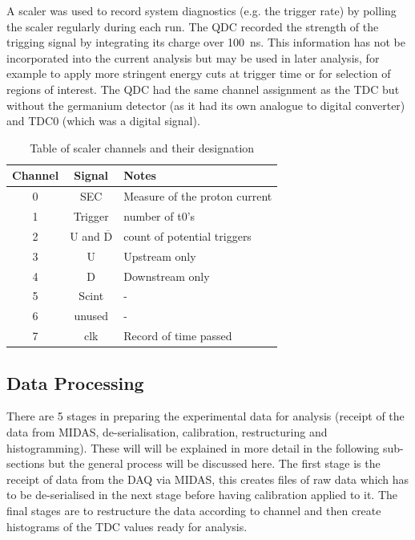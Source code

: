A scaler was used to record system diagnostics (e.g. the trigger rate) by polling the scaler regularly during each run. The QDC recorded the strength of the trigging signal by integrating its charge over 100~ns. This information has not be incorporated into the current analysis but may be used in later analysis, for example to apply more stringent energy cuts at trigger time or for selection of regions of interest. The QDC had the same channel assignment as the TDC but without the germanium detector (as it had its own analogue to digital converter) and TDC0 (which was a digital signal).
\begin{table}
    \centering
    \begin{tabular}{c|c|l}
        Channel & Signal & Notes\\
        \hline
        0 & SEC & Measure of the proton current\\
        1 & Trigger & number of t0's\\
        2 & U and $\overline{\text{D}}$ & count of potential triggers\\
        3 & U & Upstream only\\
        4 & D & Downstream only\\
        5 & Scint & -\\
        6 & unused & -\\
        7 & clk & Record of time passed\\
    \end{tabular}
    \caption{Table of scaler channels and their designation}
    \label{tab:scaler_chs}
\end{table}

\subsection{Data Processing} %
\label{sec:run_data}
There are 5 stages in preparing the experimental data for analysis (receipt of the data from MIDAS, de-serialisation, calibration, restructuring and histogramming). These will will be explained in more detail in the following sub-sections but the general process will be discussed here. The first stage is the receipt of data from the DAQ via MIDAS, this creates files of raw data which has to be de-serialised in the next stage before having calibration applied to it. The final stages are to restructure the data according to channel and then create histograms of the TDC values ready for analysis. 

